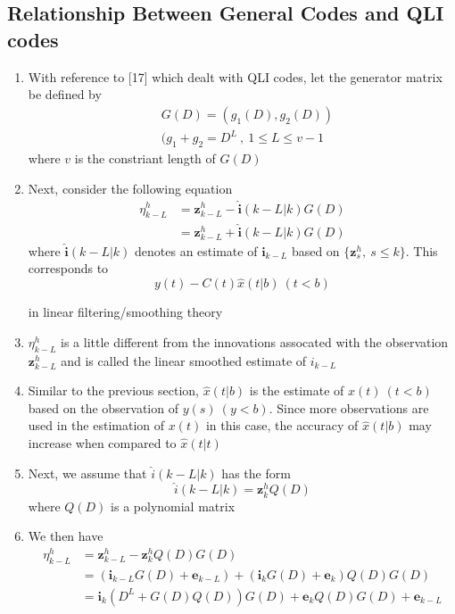 \documentclass[fontsize=12pt]{article}
\theoremstyle{definition}
\begin{document}
\subsection{Relationship Between General Codes and QLI codes}
\begin{enumerate}
\item With reference to [17] which dealt with QLI codes, let the generator matrix be defined by
\begin{equation}
\begin{aligned}
&G(D) =(g_1(D), g_2(D))\\
&(g_1+g_2 =D^L~,~1 \leq L \leq v-1
\end{aligned}
\end{equation}
where $v$ is the constriant length of $G(D)$


\item Next, consider the following equation
\begin{equation}
\begin{aligned}
\eta_{k-L}^h &= \mathbf{z}_{k-L}^h - \hat{\mathbf{i}}(k-L|k)G(D)\\
&= \mathbf{z}_{k-L}^h + \hat{\mathbf{i}}(k-L|k)G(D)
\end{aligned}
\end{equation}
where $\hat{\mathbf{i}}(k-L|k)$ denotes an estimate of ${\mathbf{i}}_{k-L}$ based on $\{\mathbf{z}_s^h,~s \leq k  \}$. This corresponds to
\begin{equation}
y(t) -C(t)\hat{x}(t|b)~ (t<b)
\end{equation}

 in linear filtering/smoothing theory

\item $\eta_{k-L}^h$ is a little different from the innovations assocated with the observation $\mathbf{z}_{k-L}^h $ and is called the linear smoothed estimate of $i_{k-L}$

\item Similar to the previous section, $\hat{x}(t|b)$ is the estimate of $x(t)~(t<b)$ based on the observation of $y(s)~(y<b)$. Since more observations are used in the estimation of $x(t)$ in this case, the accuracy of $\hat{x}(t|b)$ may increase when compared to $\hat{x}(t|t)$

\item Next, we assume that $\hat{i}(k-L|k)$ has the form 
\begin{equation}
\hat{i}(k-L|k)=\mathbf{z}_{k}^hQ(D)
\end{equation}
where $Q(D)$ is a polynomial matrix
\item We then have 
\begin{equation}
\begin{aligned}
\eta_{k-L}^h &= \mathbf{z}_{k-L}^h - \mathbf{z}_{k}^hQ(D)G(D)\\
&=\left(\mathbf{i}_{k-L} G(D)+\mathbf{e}_{k-L}\right)+\left(\mathbf{i}_{k} G(D)+\mathbf{e}_{k}\right) Q(D) G(D) \\
&=\mathbf{i}_{k}\left(D^L+G(D) Q(D)\right) G(D)+\mathbf{e}_{k} Q(D) G(D)+\mathbf{e}_{k-L}
\end{aligned}
\end{equation}


\end{enumerate}
\end{document}
